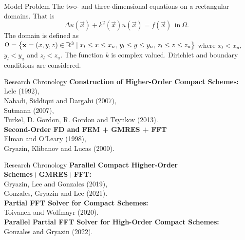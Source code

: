 \documentclass[handout]{beamer}
\begin{document}





\begin{frame}{Model Problem}
The two- and three-dimensional \helm equations on a rectangular domains. That is
\begin{equation}
\Delta u(\vec{x})+k^2(\vec{x})u(\vec{x})=f(\vec{x})\ \  \text{in}  \ \Omega.\nonumber%
\end{equation}
The domain is defined as $\Omega =\left\{ \mathbf{x}=(x,y,z) \in \mathbb{R}^3 \mid x_l \le x\le x_u, \, y_l \le y\le y_u, \, z_l \le z\le z_u\right\}$ where $ x_l < x_u$, $ y_l < y_u$ and $z_l<z_u$. The function $k$ is complex valued. Dirichlet and \somm boundary conditions are considered.
\end{frame}


\begin{frame}{Research Chronology}
\textbf{Construction of Higher-Order Compact Schemes:}\\
Lele (1992),\\
Nabadi, Siddiqui and Dargahi (2007),\\
Sutmann (2007),\\
Turkel, D. Gordon, R. Gordon and Tsynkov (2013).\\[1em]
\textbf{Second-Order FD and FEM + GMRES + FFT}\\
Elman and O'Leary (1998),\\
Gryazin, Klibanov and Lucas (2000).\\[1em]
\end{frame}


\begin{frame}{Research Chronology}
\textbf{Parallel Compact Higher-Order Schemes+GMRES+FFT:}\\
Gryazin, Lee and Gonzales (2019),\\
Gonzales, Gryazin and Lee (2021).\\[1em]
\textbf{Partial FFT Solver for Compact Schemes:}\\
Toivanen and Wolfmayr (2020).\\[1em]
\textbf{Parallel Partial FFT Solver for High-Order Compact Schemes:}\\
Gonzales and Gryazin (2022).\\[1em]
\end{frame}
\end{document}
